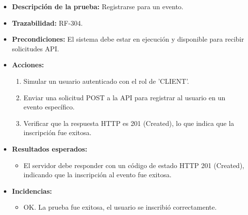 \begin{itemize}
    \item \textbf{Descripción de la prueba:} Registrarse para un evento.
    \item \textbf{Trazabilidad:} RF-304.
    \item \textbf{Precondiciones:} El sistema debe estar en ejecución y disponible para recibir solicitudes API.
    \item \textbf{Acciones:}
    \begin{enumerate}
        \item Simular un usuario autenticado con el rol de 'CLIENT'.
        \item Enviar una solicitud POST a la API para registrar al usuario en un evento específico.
        \item Verificar que la respuesta HTTP es 201 (Created), lo que indica que la inscripción fue exitosa.
    \end{enumerate}
    \item \textbf{Resultados esperados:}
    \begin{itemize}
        \item El servidor debe responder con un código de estado HTTP 201 (Created), indicando que la inscripción al evento fue exitosa.
    \end{itemize}
    \item \textbf{Incidencias:}
    \begin{itemize}
        \item OK. La prueba fue exitosa, el usuario se inscribió correctamente.
    \end{itemize}
\end{itemize}

